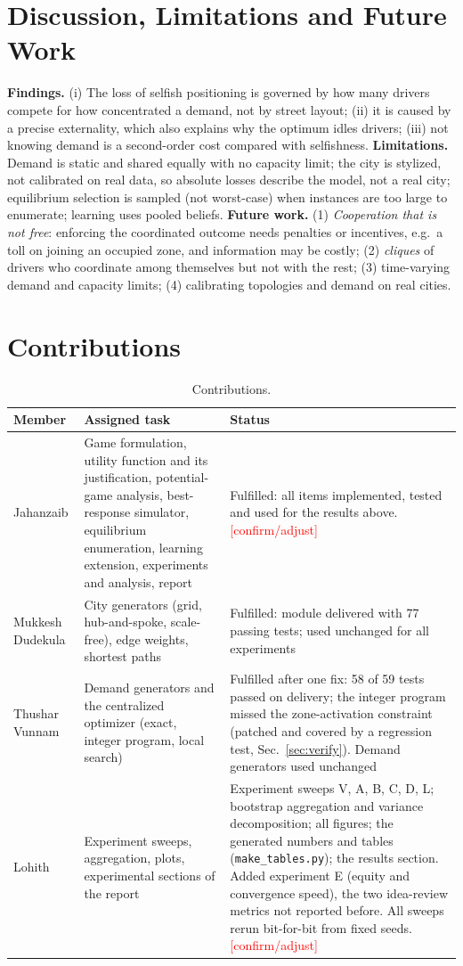 \documentclass[11pt]{article}
\newcommand{\confirm}[1]{\textcolor{red}{#1}}
\begin{document}
\section{Discussion, Limitations and Future Work}\label{sec:disc}
\textbf{Findings.} (i) The loss of selfish positioning is governed by how many drivers compete for how concentrated a demand, not by street layout; (ii) it is caused by a precise externality, which also explains why the optimum idles drivers; (iii) not knowing demand is a second-order cost compared with selfishness. \textbf{Limitations.} Demand is static and shared equally with no capacity limit; the city is stylized, not calibrated on real data, so absolute losses describe the model, not a real city; equilibrium selection is sampled (not worst-case) when instances are too large to enumerate; learning uses pooled beliefs. \textbf{Future work.} (1) \emph{Cooperation that is not free}: enforcing the coordinated outcome needs penalties or incentives, e.g.\ a toll on joining an occupied zone, and information may be costly; (2) \emph{cliques} of drivers who coordinate among themselves but not with the rest; (3) time-varying demand and capacity limits; (4) calibrating topologies and demand on real cities.

\section{Contributions}\label{sec:contrib}
\begin{table}[!ht]\centering\footnotesize
\begin{tabular}{p{2.1cm}p{5.6cm}p{7.0cm}}\toprule \textbf{Member} & \textbf{Assigned task} & \textbf{Status}\\\midrule
Jahanzaib & Game formulation, utility function and its justification, potential-game analysis, best-response simulator, equilibrium enumeration, learning extension, experiments and analysis, report & Fulfilled: all items implemented, tested and used for the results above. \confirm{[confirm/adjust]}\\
Mukkesh Dudekula & City generators (grid, hub-and-spoke, scale-free), edge weights, shortest paths & Fulfilled: module delivered with 77 passing tests; used unchanged for all experiments\\
Thushar Vunnam & Demand generators and the centralized optimizer (exact, integer program, local search) & Fulfilled after one fix: 58 of 59 tests passed on delivery; the integer program missed the zone-activation constraint (patched and covered by a regression test, Sec.~\ref{sec:verify}). Demand generators used unchanged\\
Lohith & Experiment sweeps, aggregation, plots, experimental sections of the report & Experiment sweeps V, A, B, C, D, L; bootstrap aggregation and variance decomposition; all figures; the generated numbers and tables (\texttt{make\_tables.py}); the results section. Added experiment E (equity and convergence speed), the two idea-review metrics not reported before. All sweeps rerun bit-for-bit from fixed seeds. \confirm{[confirm/adjust]}\\\bottomrule
\end{tabular}\caption{Contributions.}\end{table}
\end{document}
